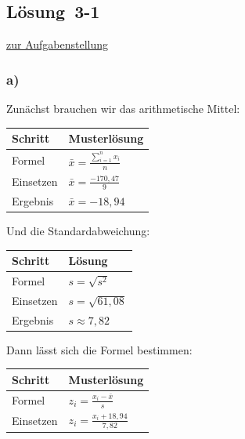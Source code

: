 \documentclass[
  11pt,
  ngerman,
  a4paper,
]{report}
\begin{document}
\hypertarget{loesung-3-1}{%
\subsection{Lösung~3-1}\label{loesung-3-1}}

\protect\hyperlink{aufgabe-3-1}{zur Aufgabenstellung}

\hypertarget{a-8}{%
\subsubsection{a)}\label{a-8}}

Zunächst brauchen wir das arithmetische Mittel:

\begin{table}[H]
\centering
\begin{tabular}{ll}
\toprule
\textbf{Schritt} & \textbf{Musterlösung}\\
\midrule
Formel & $\bar{x}=\frac{\sum\limits_{i=1}^{n}x_{i}}{n}$\\
Einsetzen & $\bar{x}=\frac{-170{,}47}{9}$\\
Ergebnis & $\bar{x}=-18{,}94$\\
\bottomrule
\end{tabular}
\end{table}

Und die Standardabweichung:

\begin{table}[H]
\centering
\begin{tabular}{ll}
\toprule
\textbf{Schritt} & \textbf{Lösung}\\
\midrule
Formel & $s=\sqrt{s^2}$\\
Einsetzen & $s=\sqrt{61{,}08}$\\
Ergebnis & $s\approx7{,}82$\\
\bottomrule
\end{tabular}
\end{table}

Dann lässt sich die Formel bestimmen:

\begin{table}[H]
\centering
\begin{tabular}{ll}
\toprule
\textbf{Schritt} & \textbf{Musterlösung}\\
\midrule
Formel & $z_{i} = \frac{x_{i} - \bar{x}}{s}$\\
Einsetzen & $z_{i} = \frac{x_{i} +18{,}94}{7{,}82}$\\
\bottomrule
\end{tabular}
\end{table}
\end{document}
